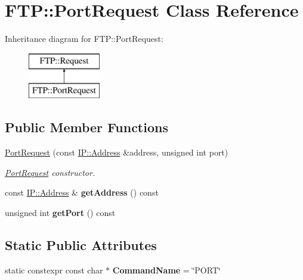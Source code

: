 \hypertarget{class_f_t_p_1_1_port_request}{\section{F\-T\-P\-:\-:Port\-Request Class Reference}
\label{class_f_t_p_1_1_port_request}
}
Inheritance diagram for F\-T\-P\-:\-:Port\-Request\-:\begin{figure}[H]
\begin{center}
\leavevmode
\includegraphics[height=2.000000cm]{class_f_t_p_1_1_port_request}
\end{center}
\end{figure}
\subsection*{Public Member Functions}
\begin{DoxyCompactItemize}
\item 
\hyperlink{class_f_t_p_1_1_port_request_a880ff4f41e2bcec2cfac43a6c90c5511}{Port\-Request} (const \hyperlink{class_f_t_p_1_1_i_p_1_1_address}{I\-P\-::\-Address} \&address, unsigned int port)
\begin{DoxyCompactList}\small\item\em \hyperlink{class_f_t_p_1_1_port_request}{Port\-Request} constructor. \end{DoxyCompactList}\item 
\hypertarget{class_f_t_p_1_1_port_request_a056cc2a789af4cf9e2b1655a607803fd}{const \hyperlink{class_f_t_p_1_1_i_p_1_1_address}{I\-P\-::\-Address} \& {\bfseries get\-Address} () const }\label{class_f_t_p_1_1_port_request_a056cc2a789af4cf9e2b1655a607803fd}

\item 
\hypertarget{class_f_t_p_1_1_port_request_a24bba13c833381f9cee9977c838a7571}{unsigned int {\bfseries get\-Port} () const }\label{class_f_t_p_1_1_port_request_a24bba13c833381f9cee9977c838a7571}

\end{DoxyCompactItemize}
\subsection*{Static Public Attributes}
\begin{DoxyCompactItemize}
\item 
\hypertarget{class_f_t_p_1_1_port_request_abe4ea52bfb6cce24fb0a0de77d742804}{static constexpr const char $\ast$ {\bfseries Command\-Name} = \char`\"{}P\-O\-R\-T\char`\"{}}\label{class_f_t_p_1_1_port_request_abe4ea52bfb6cce24fb0a0de77d742804}

\end{DoxyCompactItemize}


